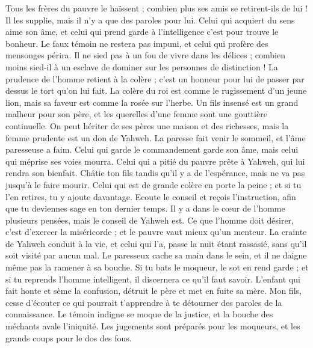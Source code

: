 \begin{multicols}{2}
Tous les frères du pauvre le haïssent ; combien plus ses amis se retirent-ils de lui ! Il les supplie, mais il n'y a que des paroles pour lui.
Celui qui acquiert du sens aime son âme, et celui qui prend garde à l'intelligence c'est pour trouve le bonheur.
Le faux témoin ne restera pas impuni, et celui qui profère des mensonges périra.
Il ne sied pas à un fou de vivre dans les délices ; combien moins sied-il à un esclave de dominer sur les personnes de distinction !
La prudence de l'homme retient à la colère ; c'est un honneur pour lui de passer par dessus le tort qu'on lui fait.
La colère du roi est comme le rugissement d'un jeune lion, mais sa faveur est comme la rosée sur l'herbe.
Un fils insensé est un grand malheur pour son père, et les querelles d'une femme sont une gouttière continuelle.
On peut hériter de ses pères une maison et des richesses, mais la femme prudente est un don de Yahweh.
La paresse fait venir le sommeil, et l'âme paresseuse a faim.
Celui qui garde le commandement garde son âme, mais celui qui méprise ses voies mourra.
Celui qui a pitié du pauvre prête à Yahweh, qui lui rendra son bienfait.
Châtie ton fils tandis qu'il y a de l'espérance, mais ne va pas jusqu'à le faire mourir.
Celui qui est de grande colère en porte la peine ; et si tu l'en retires, tu y ajoute davantage.
Ecoute le conseil et reçois l'instruction, afin que tu deviennes sage en ton dernier temps.
Il y a dans le cœur de l'homme plusieurs pensées, mais le conseil de Yahweh est.
Ce que l'homme doit désirer, c'est d'exercer la miséricorde ; et le pauvre vaut mieux qu'un menteur.
La crainte de Yahweh conduit à la vie, et celui qui l'a, passe la nuit étant rassasié, sans qu'il soit visité par aucun mal.
Le paresseux cache sa main dans le sein, et il ne daigne même pas la ramener à sa bouche.
Si tu bats le moqueur, le sot en rend garde ; et si tu reprends l'homme intelligent, il discernera ce qu'il faut savoir.
L'enfant qui fait honte et sème la confusion, détruit le père et met en fuite sa mère.
Mon fils, cesse d'écouter ce qui pourrait t'apprendre à te détourner des paroles de la connaissance.
Le témoin indigne se moque de la justice, et la bouche des méchants avale l'iniquité.
Les jugements sont préparés pour les moqueurs, et les grands coups pour le dos des fous.

\end{multicols}

